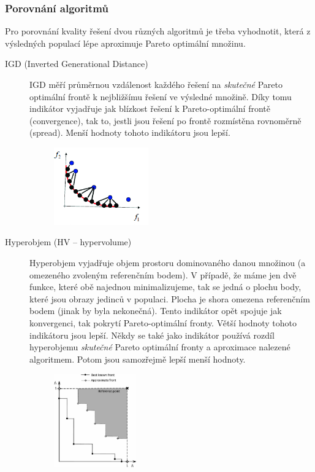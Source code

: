 \subsubsection{Porovnání algoritmů}
Pro porovnání kvality řešení dvou různých algoritmů je třeba vyhodnotit, která z výsledných populací lépe aproximuje Pareto optimální množinu. 
\begin{description}
	
	
	\item[IGD (Inverted Generational Distance)] IGD měří průměrnou vzdálenost každého řeše\-ní na \textit{skutečné} Pareto optimální frontě k nejbližšímu řešení ve výsledné množině. Díky tomu indikátor vyjadřuje jak blízkost řešení k Pareto-optimální frontě (convergence), tak to, jestli jsou řešení po frontě rozmístěna rovnoměrně (spread). Menší hodnoty tohoto indikátoru jsou lepší. 
	\begin{figure}[H]
		\centering
		\includegraphics[width=0.4\textwidth]{img/igd.png}
	\end{figure}
	
	\item[Hyperobjem (HV -- hypervolume)] Hyperobjem vyjadřuje objem prostoru dominovaného danou množinou (a omezeného zvoleným referenčním bodem). V případě, že máme jen dvě funkce, které obě najednou minimalizujeme, tak se jedná o plochu  body, které jsou obrazy jedinců v populaci. Plocha je shora omezena referenčním bodem (jinak by byla nekonečná). Tento indikátor opět spojuje jak konvergenci, tak pokrytí Pareto-optimální fronty. Větší hodnoty tohoto indikátoru jsou lepší. Někdy se také jako indikátor používá rozdíl hyperobjemu \textit{skutečné} Pareto optimální fronty a aproximace nalezené algoritmem. Potom jsou samozřejmě lepší menší hodnoty.
	\begin{figure}[H]
		\centering
		\includegraphics[width=0.35\textwidth]{img/hypervolume.png}
	\end{figure}
	
\end{description}
